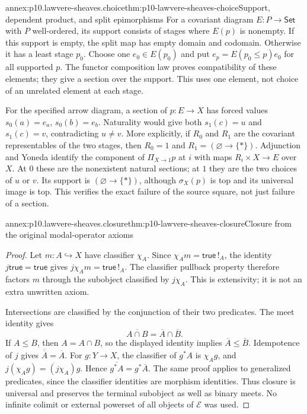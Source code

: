 \begin{annexitem}{annex:p10.lawvere-sheaves.choice}{thm:p10-lawvere-sheaves-choice}{Support, dependent product, and split epimorphisms}
For a covariant diagram \(E:P\to\mathsf{Set}\) with \(P\)
well-ordered, its support consists of stages where \(E(p)\) is
nonempty.  If this support is empty, the split map has empty domain
and codomain.  Otherwise it has a least stage \(p_0\).  Choose
one \(e_0\in E(p_0)\) and put
\(e_p=E(p_0\leq p)e_0\) for all supported \(p\).
The functor composition law proves compatibility of these elements;
they give a section over the support.  This uses one element, not
choice of an unrelated element at each stage.

For the specified arrow diagram, a section of \(p:E\to X\)
has forced values \(s_0(a)=e_a\), \(s_0(b)=e_b\).
Naturality would give both \(s_1(c)=u\) and \(s_1(c)=v\),
contradicting \(u\ne v\).  More explicitly, if \(R_0\) and
\(R_1\) are the covariant representables of the two stages, then
\(R_0=1\) and \(R_1=(\varnothing\to\{*\})\).
Adjunction and Yoneda identify the component of \(\Pi_{X\to1}p\)
at \(i\) with maps \(R_i\times X\to E\) over \(X\).
At \(0\) these are the nonexistent natural sections; at \(1\)
they are the two choices of \(u\) or \(v\).  Its support is
\((\varnothing\to\{*\})\), although \(\sigma_X(p)\)
is top and its universal image is top.  This verifies the exact
failure of the source square, not just failure of a section.
\end{annexitem}

\begin{annexitem}{annex:p10.lawvere-sheaves.closure}{thm:p10-lawvere-sheaves-closure}{Closure from the original modal-operator axioms}
\begin{proof}
Let \(m:A\hookrightarrow X\) have classifier \(\chi_A\).
Since \(\chi_Am=\mathsf{true}\,!_A\), the identity
\(j\mathsf{true}=\mathsf{true}\) gives
\(j\chi_Am=\mathsf{true}\,!_A\).  The classifier pullback
property therefore factors \(m\) through the subobject classified
by \(j\chi_A\).  This is extensivity; it is not an extra
unwritten axiom.

Intersections are classified by the conjunction of their two
predicates.  The meet identity gives
\[
        \overline{A\cap B}=\overline A\cap\overline B.
\]
If \(A\leq B\), then \(A=A\cap B\), so the displayed
identity implies \(\overline A\leq\overline B\).
Idempotence of \(j\) gives
\(\overline{\overline A}=\overline A\).
For \(g:Y\to X\), the classifier of \(g^*A\) is
\(\chi_Ag\), and
\(j(\chi_Ag)=(j\chi_A)g\).  Hence
\(\overline{g^*A}=g^*\overline A\).
The same proof applies to generalized predicates, since the
classifier identities are morphism identities.  Thus closure is
universal and preserves the terminal subobject as well as binary
meets.  No infinite colimit or external powerset of all objects
of \(\mathcal E\) was used.
\end{proof}
\end{annexitem}


